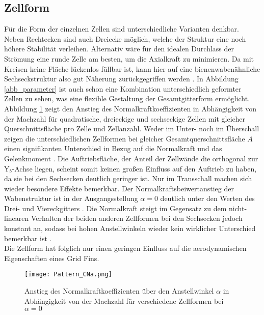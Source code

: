 \subsection{Zellform} \label{sec_zellform}
Für die Form der einzelnen Zellen sind unterschiedliche Varianten denkbar. Neben Rechtecken sind auch Dreiecke möglich, welche der Struktur eine noch höhere Stabilität verleihen. Alternativ wäre für den idealen Durchlass der Strömung eine runde Zelle am besten, um die Axialkraft zu minimieren. Da mit Kreisen keine Fläche lückenlos füllbar ist, kann hier auf eine bienenwabenähnliche Sechseckstruktur also gut Näherung zurückgegriffen werden \cite{Pattern}. In Abbildung \ref{abb_parameter} ist auch schon eine Kombination unterschiedlich geformter Zellen zu sehen, was eine flexible Gestaltung der Gesamtgitterform ermöglicht.\\
Abbildung \ref{abb_Form-Cn} zeigt den Anstieg des Normalkraftkoeffizienten in Abhängigkeit von der Machzahl für quadratische, dreieckige und sechseckige Zellen mit gleicher Querschnittsfläche pro Zelle und Zellanzahl.
Weder im Unter- noch im Überschall zeigen die unterschiedlichen Zellformen bei gleicher Gesamtquerschnittsfläche $A$ einen signifikanten Unterschied in Bezug auf die Normalkraft und das Gelenkmoment \cite{Pattern}. Die Auftriebsfläche, der Anteil der Zellwände die orthogonal zur Y$_b$-Achse liegen, scheint somit keinen großen Einfluss auf den Auftrieb zu haben, da sie bei den Sechsecken deutlich geringer ist. Nur im Transschall machen sich wieder besondere Effekte bemerkbar. Der Normalkraftsbeiwertanstieg der Wabenstruktur ist in der Ausgangsstellung $\alpha = 0$ deutlich unter den Werten des Drei- und Viereckgitters \cite{Pattern}. Die Normalkraft steigt im Gegensatz zu dem nicht-linearen Verhalten der beiden anderen Zellformen bei den Sechsecken jedoch konstant an, sodass bei hohen Anstellwinkeln wieder kein wirklicher Unterschied bemerkbar ist \cite{Pattern}.\\
Die Zellform hat folglich nur einen geringen Einfluss auf die aerodynamischen Eigenschaften eines Grid Fins.
\begin{figure}[h]
	\centering
	\texttt{[image: Pattern\_CNa.png]}
	\begin{flushright}
	\end{flushright}
	\caption{Anstieg des Normalkraftkoeffizienten über den Anstellwinkel $\alpha$ in Abhängigkeit von der Machzahl für verschiedene Zellformen bei $\alpha = 0$}
	\label{abb_Form-Cn}
\end{figure}
